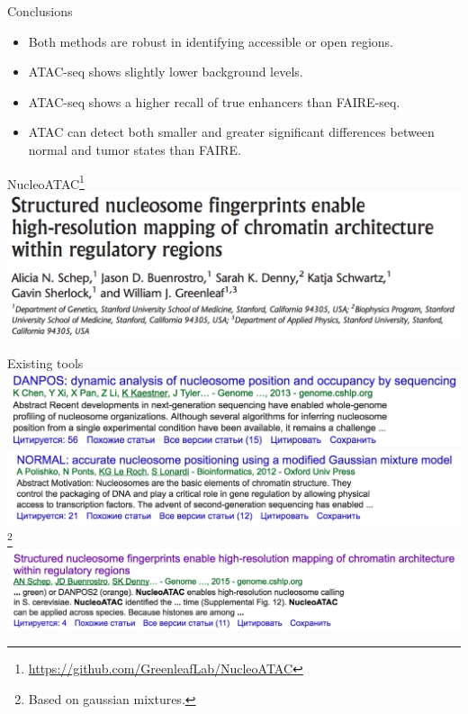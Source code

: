 \documentclass{beamer}
\begin{document}
\begin{frame}{Conclusions}
\begin{itemize}
\item Both methods are robust in identifying accessible or open regions.
\item ATAC-seq shows slightly lower background levels.
\item ATAC-seq shows a higher recall of true enhancers than FAIRE-seq.
\item ATAC can detect both smaller and greater significant differences between normal and tumor states than FAIRE.
\end{itemize}
\end{frame}


\begin{frame}{NucleoATAC\footnote{\url{https://github.com/GreenleafLab/NucleoATAC}}}
\includegraphics[width=\linewidth]{nucleoatac_paper.png}\\
\end{frame}

\begin{frame}{Existing tools}
\includegraphics[height=0.20\paperheight]{Danpos.png}\\
\includegraphics[height=0.20\paperheight]{Normal.png}\\\footnote{Based on gaussian mixtures.}
\includegraphics[height=0.20\paperheight]{nucleoatac.png}
\end{frame}
\end{document}
